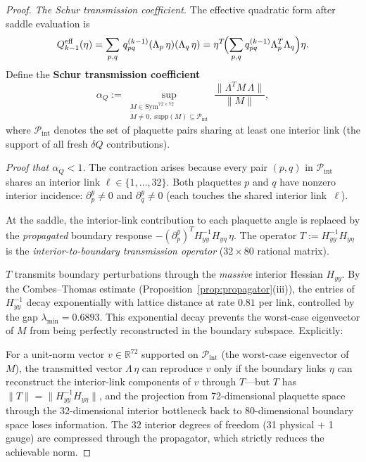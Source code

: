 \documentclass[11pt]{article}
\theoremstyle{definition}
\newcommand{\R}{\mathbb{R}}
\begin{document}
\begin{proof}
\emph{The Schur transmission coefficient.}
The effective quadratic form after saddle evaluation is
\begin{equation}\label{eq:Q-eff}
Q_{k-1}^{\mathrm{eff}}(\eta)
=\sum_{p,q}\,q_{pq}^{(k-1)}
(\Lambda_p\,\eta)(\Lambda_q\,\eta)
=\eta^T\!\Bigl(\sum_{p,q}q_{pq}^{(k-1)}
\Lambda_p^T\Lambda_q\Bigr)\eta.
\end{equation}
Define the \textbf{Schur transmission coefficient}
\begin{equation}\label{eq:alphaQ}
\alpha_Q:=\sup_{\substack{M\in\mathrm{Sym}^{72\times 72}\\
M\ne 0,\;\mathrm{supp}(M)\subseteq\mathcal{P}_{\mathrm{int}}}}
\frac{\|\Lambda^T M\,\Lambda\|}{\|M\|},
\end{equation}
where $\mathcal{P}_{\mathrm{int}}$ denotes the set of
plaquette pairs sharing at least one interior link
(the support of all fresh $\delta Q$ contributions).

\emph{Proof that $\alpha_Q<1$.}
The contraction arises because every pair $(p,q)$
in $\mathcal{P}_{\mathrm{int}}$ shares an interior link
$\ell\in\{1,\ldots,32\}$.  Both plaquettes $p$ and $q$
have nonzero interior incidence: $\partial_p^y\ne 0$ and
$\partial_q^y\ne 0$ (each touches the shared interior
link~$\ell$).

At the saddle, the interior-link contribution to each
plaquette angle is replaced by the \emph{propagated}
boundary response $-(\partial_p^y)^T H_{yy}^{-1}H_{y\eta}\,\eta$.
The operator $T:=H_{yy}^{-1}H_{y\eta}$ is the
\emph{interior-to-boundary transmission operator}
($32\times 80$ rational matrix).

$T$ transmits boundary perturbations
through the \emph{massive} interior Hessian $H_{yy}$.
By the Combes--Thomas estimate
(Proposition~\ref{prop:propagator}(iii)),
the entries of $H_{yy}^{-1}$ decay exponentially with
lattice distance at rate $0.81$ per link, controlled by
the gap $\lambda_{\min}=0.6893$.
This exponential decay prevents the worst-case eigenvector
of $M$ from being perfectly reconstructed in the boundary
subspace.  Explicitly:

For a unit-norm vector $v\in\R^{72}$ supported on
$\mathcal{P}_{\mathrm{int}}$ (the worst-case eigenvector
of $M$), the transmitted vector $\Lambda\,\eta$ can
reproduce $v$ only if the boundary links $\eta$ can
reconstruct the interior-link components of $v$ through
$T$---but $T$ has $\|T\|=\|H_{yy}^{-1}H_{y\eta}\|$,
and the projection from 72-dimensional plaquette
space through the 32-dimensional interior bottleneck
back to 80-dimensional boundary space loses information.
The $32$ interior degrees of freedom (31 physical $+$ 1 gauge)
are compressed through the propagator, which strictly
reduces the achievable norm.


\end{proof}
\end{document}
